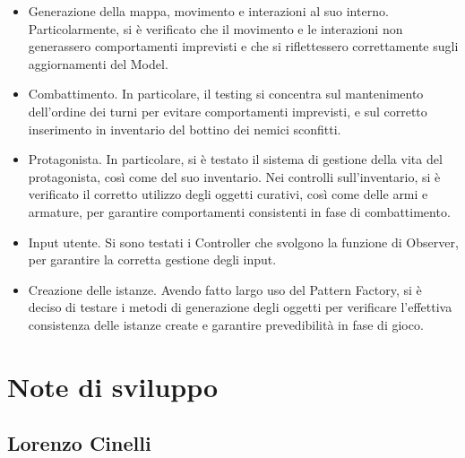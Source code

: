 \documentclass[a4paper,12pt]{report}
\begin{document}
\begin{itemize}
	\item Generazione della mappa, movimento e interazioni al suo interno. Particolarmente, si è verificato che il movimento e le interazioni non generassero comportamenti imprevisti e che si riflettessero correttamente sugli aggiornamenti del Model.
	\item Combattimento. In particolare, il testing si concentra sul mantenimento dell’ordine dei turni per evitare comportamenti imprevisti, e sul corretto inserimento in inventario del bottino dei nemici sconfitti.
	\item Protagonista. In particolare, si è testato il sistema di gestione della vita del protagonista, così come del suo inventario. Nei controlli sull’inventario, si è verificato il corretto utilizzo degli oggetti curativi, così come delle armi e armature, per garantire comportamenti consistenti in fase di combattimento.
	\item Input utente. Si sono testati i Controller che svolgono la funzione di Observer, per garantire la corretta gestione degli input.
	\item Creazione delle istanze. Avendo fatto largo uso del Pattern Factory, si è deciso di testare i metodi di generazione degli oggetti per verificare l’effettiva consistenza delle istanze create e garantire prevedibilità in fase di gioco.
\end{itemize}

\section{Note di sviluppo}

\subsection{Lorenzo Cinelli}
\end{document}
